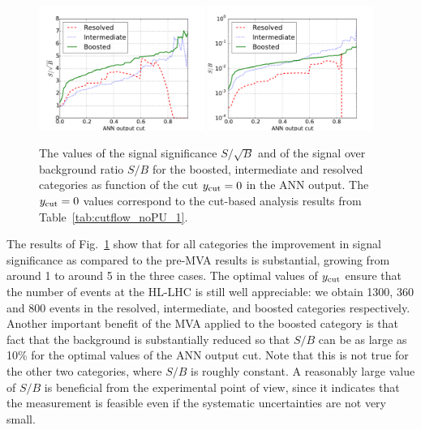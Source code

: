 \begin{figure}[t]
\begin{center}
\includegraphics[width=0.48\textwidth]{plots/ssb_noPU.pdf}
\includegraphics[width=0.48\textwidth]{plots/sb_noPU.pdf}
\caption{\small
  The values of the signal significance $S/\sqrt{B}$ and of the
  signal over background ratio $S/B$ for the boosted, intermediate
  and resolved categories as  function of the cut
  $y_{\rm cut}=0$ in the ANN output.
  The $y_{\rm cut}=0$
  values correspond to the  cut-based analysis
  results from Table~\ref{tab:cutflow_noPU_1}.
}
\label{fig:sb_mva}
\end{center}
\end{figure}

The results of Fig.~\ref{fig:sb_mva}  show that
for all categories the  improvement in signal
significance as compared to the pre-MVA results
is substantial, growing from around 1
to around 5 in the three cases.
%
The optimal values of $y_{\rm cut}$ ensure that the
number of events at the HL-LHC is still well appreciable: we obtain
1300, 360 and 800 events in the resolved, intermediate, and
boosted categories respectively.
%
Another important benefit of the MVA applied to the boosted
category is that fact that the background is substantially
reduced so that $S/B$ can be as large as 10\% for the optimal
values of the ANN output cut.
%
Note that this is not true for the other two categories,
where $S/B$ is roughly constant.
%
A reasonably large value of $S/B$ is beneficial
from the experimental point of view, since it indicates
that the measurement is feasible even if the
systematic uncertainties are not very small.



